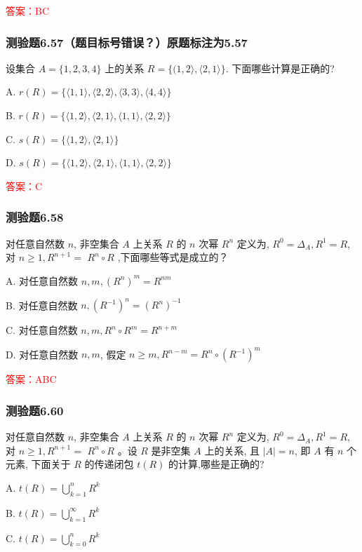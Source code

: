 \documentclass[UTF8, heading=true]{ctexart}
\begin{document}
\textcolor{red}{答案：BC}

\subsubsection{测验题6.57（题目标号错误？）原题标注为5.57}
设集合 $A=\{1,2,3,4\}$ 上的关系 $R=\{(1,2\rangle,\langle 2,1\rangle\}$. 下面哪些计算是正确的?

A. 
$
r(R)=\{\langle 1,1\rangle,\langle 2,2\rangle,\langle 3,3\rangle,\langle 4,4\rangle\}
$

B. 
$
r(R)=\{\langle 1,2\rangle,\langle 2,1\rangle,\langle 1,1\rangle,\langle 2,2\rangle\}
$

C. 
$
s(R)=\{\langle 1,2\rangle,\langle 2,1\rangle\}
$

D. 
$
s(R)=\{\langle 1,2\rangle,\langle 2,1\rangle,\langle 1,1\rangle,\langle 2,2\rangle\}
$

\textcolor{red}{答案：C}

\subsubsection{测验题6.58}

对任意自然数 $n$, 非空集合 $A$ 上关系 $R$ 的 $n$ 次幂 $R^n$ 定义为, $R^0=\Delta_A, R^1=R$, 对 $n \geq 1, R^{n+1}=$
$R^n \circ R$ ,下面哪些等式是成立的？

A. 对任意自然数 $n, m,\left(R^n\right)^m=R^{n m}$

B. 对任意自然数 $n,\left(R^{-1}\right)^n=\left(R^n\right)^{-1}$

C. 对任意自然数 $n, m, R^n \circ R^m=R^{n+m}$

D. 对任意自然数 $n, m$, 假定 $n \geq m, R^{n-m}=R^n \circ\left(R^{-1}\right)^m$

\textcolor{red}{答案：ABC}

\subsubsection{测验题6.60}

对任意自然数 $n$, 非空集合 $A$ 上关系 $R$ 的 $n$ 次幂 $R^n$ 定义为, $R^0=\Delta_A, R^1=R$, 对 $n \geq 1, R^{n+1}=$ $R^n \circ R$ 。设 $R$ 是非空集 $A$ 上的关系, 且 $|A|=n$, 即 $A$ 有 $n$ 个元素, 下面关于 $R$ 的传递闭包 $t(R)$ 的计算,哪些是正确的?

A. $t(R)=\bigcup_{k=1}^n R^k$

B. $t(R)=\bigcup_{k=1}^{\infty} R^k$

C. $t(R)=\bigcup_{k=0}^n R^k$
\end{document}
